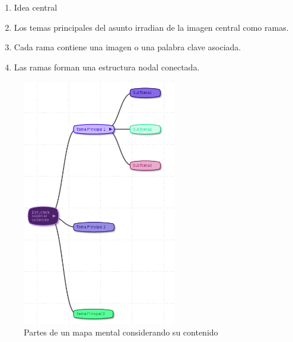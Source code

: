 \begin{enumerate}
\item Idea central
\item Los temas principales del asunto irradian de la imagen central como ramas.
\item Cada rama contiene una imagen o una palabra clave asociada.
\item Las ramas forman una estructura nodal conectada.
\end{enumerate}

\begin{figure}[htbp]
\centering
\includegraphics[width=0.6\textwidth]{imagenes/Estructura1.png}
\caption{Partes de un mapa mental considerando su contenido}
\label{fig:partescontenido}
\end{figure}